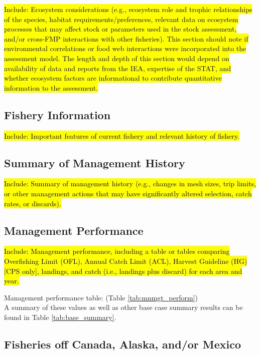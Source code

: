 \documentclass[12pt,]{article}
\begin{document}
\hl{Include: Ecosystem considerations (e.g., ecosystem role and trophic relationships of  the species, habitat requirements/preferences, relevant data on ecosystem processes  that may affect stock or parameters used in the stock assessment, and/or cross-FMP  interactions with other fisheries). This section should note if environmental  correlations or food web interactions were incorporated into the assessment model.  The length and depth of this section would depend on availability of data and reports  from the IEA, expertise of the STAT, and whether ecosystem factors are informational  to contribute quantitative information to the assessment.}

\subsection{Fishery Information}\label{fishery-information}

\hl{Include: Important features of current fishery and relevant history of fishery.}

\subsection{Summary of Management
History}\label{summary-of-management-history}

\hl{Include: Summary of management history (e.g., changes in mesh sizes, trip 
                                            limits, or other management actions that may have significantly altered selection, 
                                            catch rates, or discards).}

\subsection{Management Performance}\label{management-performance-1}

\hl{Include: Management performance, including a table or tables comparing 
  Overfishing Limit (OFL), Annual Catch Limit (ACL), Harvest Guideline (HG) 
  [CPS only], landings, and catch (i.e., landings plus discard) for each area and year.}

Management performance table: (Table \ref{tab:mnmgt_perform})\\
A summary of these values as well as other base case summary results can
be found in Table \ref{tab:base_summary}.

\subsection{Fisheries off Canada, Alaska, and/or
Mexico}\label{fisheries-off-canada-alaska-andor-mexico}
\end{document}
